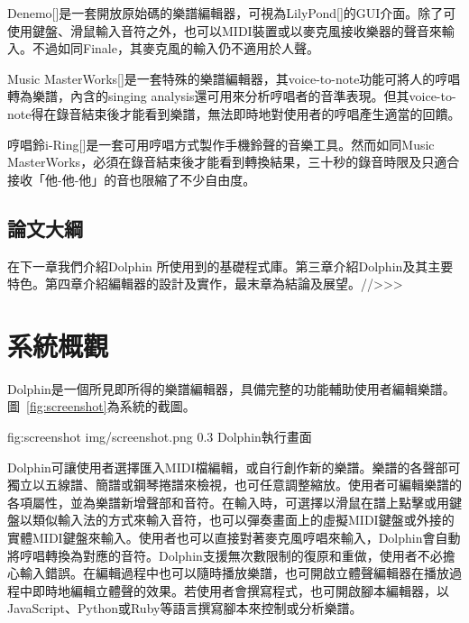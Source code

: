 \documentclass[12pt,a4paper,oneside]{report}
\begin{document}
Denemo[]是一套開放原始碼的樂譜編輯器，可視為LilyPond[]的GUI介面。除了可使用鍵盤、滑鼠輸入音符之外，也可以MIDI裝置或以麥克風接收樂器的聲音來輸入。不過如同Finale，其麥克風的輸入仍不適用於人聲。

Music MasterWorks[]是一套特殊的樂譜編輯器，其voice-to-note功能可將人的哼唱轉為樂譜，內含的singing analysis還可用來分析哼唱者的音準表現。但其voice-to-note得在錄音結束後才能看到樂譜，無法即時地對使用者的哼唱產生適當的回饋。

哼唱鈴i-Ring[]是一套可用哼唱方式製作手機鈴聲的音樂工具。然而如同Music MasterWorks，必須在錄音結束後才能看到轉換結果，三十秒的錄音時限及只適合接收「他-他-他」的音也限縮了不少自由度。

\section{論文大綱}

在下一章我們介紹Dolphin 所使用到的基礎程式庫。第三章介紹Dolphin及其主要特色。第四章介紹編輯器的設計及實作，最末章為結論及展望。//>>>

\chapter{系統概觀}

Dolphin是一個所見即所得的樂譜編輯器，具備完整的功能輔助使用者編輯樂譜。圖~\ref{fig:screenshot}為系統的截圖。

\figurewithcaption
{fig:screenshot}
{img/screenshot.png}
{0.3}
{Dolphin執行畫面}

Dolphin可讓使用者選擇匯入MIDI檔編輯，或自行創作新的樂譜。樂譜的各聲部可獨立以五線譜、簡譜或鋼琴捲譜來檢視，也可任意調整縮放。使用者可編輯樂譜的各項屬性，並為樂譜新增聲部和音符。在輸入時，可選擇以滑鼠在譜上點擊或用鍵盤以類似輸入法的方式來輸入音符，也可以彈奏畫面上的虛擬MIDI鍵盤或外接的實體MIDI鍵盤來輸入。使用者也可以直接對著麥克風哼唱來輸入，Dolphin會自動將哼唱轉換為對應的音符。Dolphin支援無次數限制的復原和重做，使用者不必擔心輸入錯誤。在編輯過程中也可以隨時播放樂譜，也可開啟立體聲編輯器在播放過程中即時地編輯立體聲的效果。若使用者會撰寫程式，也可開啟腳本編輯器，以JavaScript、Python或Ruby等語言撰寫腳本來控制或分析樂譜。
\end{document}
